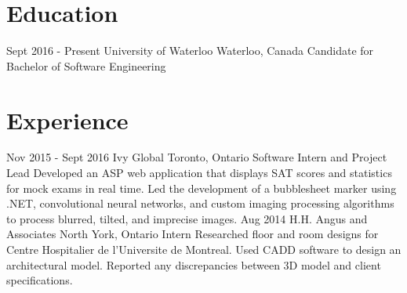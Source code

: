 \documentclass{resume}
\begin{document}
	\begin{main}
		\vspace{5pt}%
		\section{Education}
			\begin{entrylist}
				\rightentry%
				{Sept 2016 - Present}%
				{University of Waterloo}%
				{Waterloo, Canada}%
				{Candidate for Bachelor of Software Engineering}%
				{}
			\end{entrylist}
		\vspace{-10pt}%
		\section{Experience}
			\begin{entrylist}
				\rightentry%
					{Nov 2015 - Sept 2016}%
					{Ivy Global}%
					{Toronto, Ontario}%
					{Software Intern and Project Lead}%
					{Developed an ASP web application that displays SAT scores and statistics for mock exams in real time. Led the development of a bubblesheet marker using .NET, convolutional neural networks, and custom imaging processing algorithms to process blurred, tilted, and imprecise images.}
				\rightentry%
					{Aug 2014}%
					{H.H. Angus and Associates}%
					{North York, Ontario}%
					{Intern}%
					{Researched floor and room designs for Centre Hospitalier de l'Universite de Montreal. Used CADD software to design an architectural model. Reported any discrepancies between 3D model and client specifications.}
			\end{entrylist}

\end{main}
\end{document}

